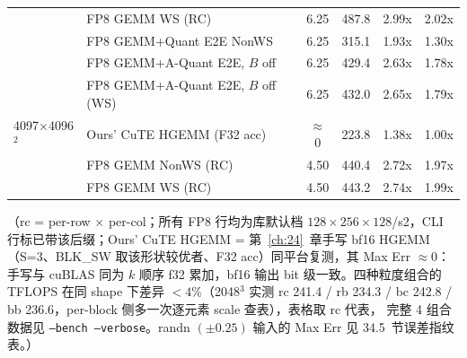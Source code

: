 \begin{center}
\begin{tabular}{llcccc}
          & FP8 GEMM WS (RC)            & 6.25  & 487.8 & 2.99x & 2.02x \\
          & FP8 GEMM+Quant E2E NonWS    & 6.25  & 315.1 & 1.93x & 1.30x \\
          & FP8 GEMM+A-Quant E2E, $B$ off & 6.25 & 429.4 & 2.63x & 1.78x \\
          & FP8 GEMM+A-Quant E2E, $B$ off (WS) & 6.25 & 432.0 & 2.65x & 1.79x \\
\midrule
4097$\times$4096$^2$ & Ours' CuTE HGEMM (F32 acc) & $\approx$0 & 223.8 & 1.38x & 1.00x \\
                     & FP8 GEMM NonWS (RC) & 4.50 & 440.4 & 2.72x & 1.97x \\
                     & FP8 GEMM WS (RC)    & 4.50 & 443.2 & 2.74x & 1.99x \\
\bottomrule
\end{tabular}
\end{center}

（rc = per-row $\times$ per-col；所有 FP8 行均为库默认档
$128\times256\times128$/s2，CLI 行标已带该后缀；Ours' CuTE HGEMM = 第~\ref{ch:24}~章手写
bf16 HGEMM（S=3、BLK\_SW 取该形状较优者、F32 acc）同平台复测，其
Max Err $\approx 0$：
手写与 cuBLAS 同为 $k$ 顺序 f32 累加，bf16 输出 bit 级一致。四种粒度组合的
TFLOPS 在同 shape 下差异 $<4\%$（2048$^3$ 实测 rc 241.4 / rb 234.3 /
bc 242.8 / bb 236.6，per-block 侧多一次逐元素 scale 查表），表格取 rc 代表，
完整 4 组合数据见 \texttt{--bench --verbose}。randn $(\pm 0.25)$ 输入的
Max Err 见 34.5~节误差指纹表。）

